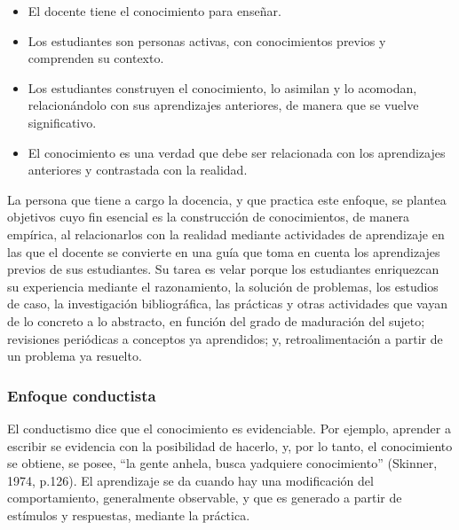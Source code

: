 \begin{itemize}
    
    \color{blue} \item \color{black} El docente tiene el conocimiento para enseñar.  

    
     \color{blue} \item \color{black} Los estudiantes son personas activas, con conocimientos previos y comprenden su contexto. 
     
    \color{blue} \item \color{black}  Los estudiantes construyen el conocimiento, lo asimilan y lo acomodan, relacionándolo con sus aprendizajes anteriores, de manera que se vuelve significativo. 
    
     \color{blue} \item \color{black} El conocimiento es una verdad que debe ser relacionada con los aprendizajes anteriores y contrastada con la realidad. 
     
     \end{itemize}
     
La persona que tiene a cargo la docencia, y que practica este enfoque, se plantea objetivos cuyo fin esencial es la construcción de conocimientos, de manera empírica, al relacionarlos con la realidad mediante actividades de aprendizaje en las que el docente se convierte en una guía que toma en cuenta los aprendizajes previos de sus estudiantes. Su tarea es velar porque los estudiantes enriquezcan su experiencia mediante el razonamiento, la solución de problemas, los estudios de caso, la investigación bibliográfica, las prácticas y otras actividades que vayan de lo concreto a lo abstracto, en función del grado de maduración del sujeto; revisiones periódicas a conceptos ya aprendidos; y, retroalimentación a partir de un problema ya resuelto. 

\subsubsection*{Enfoque conductista}

El conductismo dice que el conocimiento es evidenciable. Por ejemplo, aprender a escribir se evidencia con la posibilidad de hacerlo, y, por lo tanto, el conocimiento se obtiene, se posee, “la gente anhela, busca yadquiere conocimiento” (Skinner, 1974, p.126). El aprendizaje se da cuando hay una modificación del comportamiento, generalmente observable, y que es generado a partir de estímulos y respuestas, mediante la práctica.

